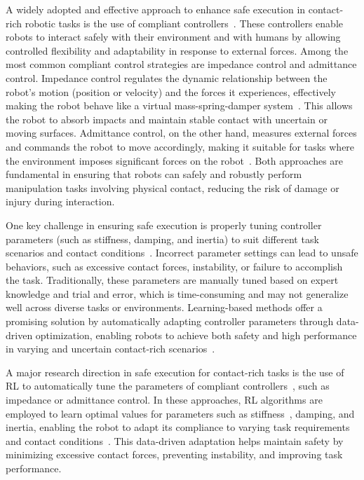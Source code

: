 \documentclass[Afour,sageh,times]{template/sagej}
\begin{document}
A widely adopted and effective approach to enhance safe execution in contact-rich robotic tasks is the use of compliant controllers~\cite{317,hogan1985impedance,24,23,samadikhoshkho_review_2025}. These controllers enable robots to interact safely with their environment and with humans by allowing controlled flexibility and adaptability in response to external forces. Among the most common compliant control strategies are impedance control and admittance control. Impedance control regulates the dynamic relationship between the robot's motion (position or velocity) and the forces it experiences, effectively making the robot behave like a virtual mass-spring-damper system~\cite{hogan1985impedance}. This allows the robot to absorb impacts and maintain stable contact with uncertain or moving surfaces. Admittance control, on the other hand, measures external forces and commands the robot to move accordingly, making it suitable for tasks where the environment imposes significant forces on the robot~\cite{232,205}. Both approaches are fundamental in ensuring that robots can safely and robustly perform manipulation tasks involving physical contact, reducing the risk of damage or injury during interaction.

One key challenge in ensuring safe execution is properly tuning controller parameters (such as stiffness, damping, and inertia) to suit different task scenarios and contact conditions~\cite{calanca2015review}. Incorrect parameter settings can lead to unsafe behaviors, such as excessive contact forces, instability, or failure to accomplish the task. Traditionally, these parameters are manually tuned based on expert knowledge and trial and error, which is time-consuming and may not generalize well across diverse tasks or environments. Learning-based methods offer a promising solution by automatically adapting controller parameters through data-driven optimization, enabling robots to achieve both safety and high performance in varying and uncertain contact-rich scenarios~\cite{cruz2024learning,10705419}.

A major research direction in safe execution for contact-rich tasks is the use of RL to automatically tune the parameters of compliant controllers~\cite{elguea2023review}, such as impedance or admittance control. In these approaches, RL algorithms are employed to learn optimal values for parameters such as stiffness~\cite{zhang2024srl}, damping, and inertia, enabling the robot to adapt its compliance to varying task requirements and contact conditions~\citep{martinez2015safe}. This data-driven adaptation helps maintain safety by minimizing excessive contact forces, preventing instability, and improving task performance.
\end{document}
